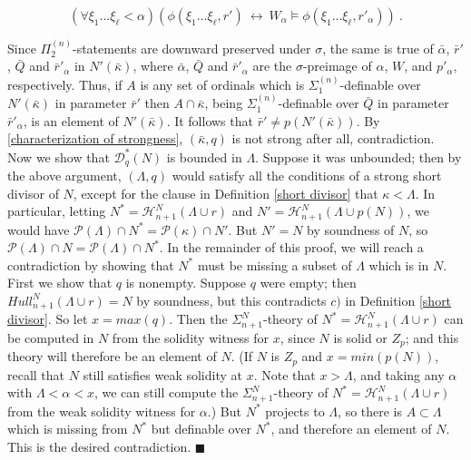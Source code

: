 \documentclass[12pt]{article}
\begin{document}
\[
( \forall \xi_1 ... \xi_\ell < \alpha ) (\phi ( \xi_1 ... \xi_\ell , r') \ \leftrightarrow \ W_\alpha \models \phi ( \xi_1 ... \xi_\ell , r'_\alpha )) \ .
\]

Since $\Pi_2^{(n)}$-statements are downward preserved under $\sigma$, the same is true of $\bar{\alpha}$, $\bar{r}'$, $\bar{Q}$ and $\bar{r}'_\alpha$ in $N'(\bar{\kappa})$, where $\bar{\alpha}$, $\bar{Q}$ and $\bar{r}'_\alpha$ are the $\sigma$-preimage of $\alpha$, $W$, and $p'_\alpha$, respectively.  Thus, if $A$ is any set of ordinals which is $\Sigma_1^{(n)}$-definable over $N'(\bar{\kappa})$ in parameter $\bar{r}'$ then $A \cap \bar{\kappa}$, being $\Sigma_1^{(n)}$-definable over $\bar{Q}$ in parameter $\bar{r}'_\alpha$, is an element of $N'(\bar{\kappa})$.  It follows that $\bar{r}' \neq p(N'(\bar{\kappa}))$.  By \ref{characterization of strongness}, $(\bar{\kappa} , q)$ is not strong after all, contradiction.\\


Now we show that $\mathcal{D}^*_q (N)$ is bounded in $\Lambda$.  Suppose it was unbounded; then by the above argument, $( \Lambda , q)$ would satisfy all the conditions of a strong short divisor of $N$, except for the clause in Definition \ref{short divisor} that $\kappa < \Lambda$.  In particular, letting $N^* = \mathcal{H}_{n+1}^N ( \Lambda \cup r)$ and $N' = \mathcal{H}_{n+1}^N ( \Lambda \cup p(N))$, we would have $\mathcal{P} (\Lambda ) \cap N^* = \mathcal{P} (\kappa ) \cap N'$.  But $N' = N$ by soundness of $N$, so $\mathcal{P} (\Lambda) \cap N = \mathcal{P} ( \Lambda) \cap N^*$.  In the remainder of this proof, we will reach a contradiction by showing that $N^*$ must be missing a subset of $\Lambda$ which is in $N$.\\

First we show that $q$ is nonempty.  Suppose $q$ were empty; then $Hull_{n+1}^N (\Lambda \cup r) = N$ by soundness, but this contradicts $c)$ in Definition \ref{short divisor}.  So let $x = max (q)$.  Then the $\Sigma_{n+1}^N$-theory of $N^* = \mathcal{H}_{n+1}^N (\Lambda \cup r)$ can be computed in $N$ from the solidity witness for $x$, since $N$ is solid or $Z_p$; and this theory will therefore be an element of $N$.  (If $N$ is $Z_p$ and $x = min (p (N))$, recall that $N$ still satisfies weak solidity at $x$.  Note that $x > \Lambda$, and taking any $\alpha$ with $\Lambda < \alpha < x$, we can still compute the $\Sigma_{n+1}^N$-theory of $N^* = \mathcal{H}_{n+1}^N (\Lambda \cup r)$ from the weak solidity witness for $\alpha$.)  But $N^*$ projects to $\Lambda$, so there is $A \subset \Lambda$ which is missing from $N^*$ but definable over $N^*$, and therefore an element of $N$.  This is the desired contradiction. $\blacksquare$\\
\end{document}

